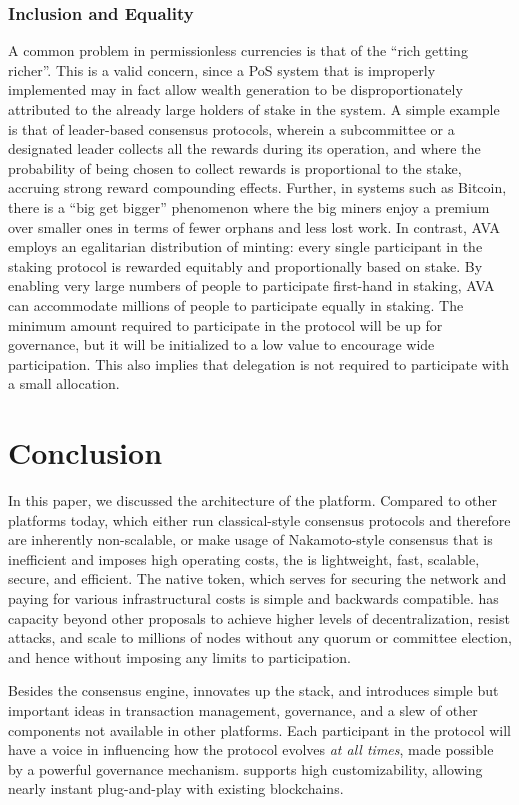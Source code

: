 \documentclass[runningheads]{llncs}
\begin{document}
\subsubsection{Inclusion and Equality}
A common problem in permissionless currencies is that of the ``rich getting richer''. This is a valid concern, since a PoS system that is improperly implemented may in fact allow wealth generation to be disproportionately attributed to the already large holders of stake in the system. A simple example is that of leader-based consensus protocols, wherein a subcommittee or a designated leader collects all the rewards during its operation, and where the probability of being chosen to collect rewards is proportional to the stake, accruing strong reward compounding effects. Further, in systems such as Bitcoin, there is a ``big get bigger'' phenomenon where the big miners enjoy a premium over smaller ones in terms of fewer orphans and less lost work.
In contrast, AVA employs an egalitarian distribution of minting: every single participant in the staking protocol is rewarded equitably and proportionally based on stake. By enabling very large numbers of people to participate first-hand in staking, AVA can accommodate millions of people to participate equally in staking. The minimum amount required to participate in the protocol will be up for governance, but it will be initialized to a low value to encourage wide participation. This also implies that delegation is not required to participate with a small allocation. 

\section{Conclusion}
\label{section:conclusion}
In this paper, we discussed the architecture of the \AVAPlatformName{} platform. Compared to other platforms today, which either run classical-style consensus protocols and therefore are inherently non-scalable, or make usage of Nakamoto-style consensus that is inefficient and imposes high operating costs, the \AVAPlatformName{} is lightweight, fast, scalable, secure, and efficient. The native token, which serves for securing the network and paying for various infrastructural costs is simple and backwards compatible. \AVATokenName{} has capacity beyond other proposals to achieve higher levels of decentralization, resist attacks, and scale to millions of nodes without any quorum or committee election, and hence without imposing any limits to participation. 

Besides the consensus engine, \AVAPlatformName{} innovates up the stack, and introduces simple but important ideas in transaction management, governance, and a slew of other components not available in other platforms. Each participant in the protocol will have a voice in influencing how the protocol evolves \emph{at all times}, made possible by a powerful governance mechanism. \AVAPlatformName{} supports high customizability, allowing nearly instant plug-and-play with existing blockchains. 



\end{document}
